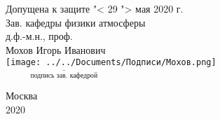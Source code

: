 \begin{titlepage}
\vspace{2em}

\noindent Допущена к защите "< 29 "> мая 2020 г. \\
Зав. кафедры физики атмосферы \\ 
д.ф.-м.н., проф. \\
Мохов Игорь Иванович \\
\hspace*{1.4cm}\vspace*{-0.8cm}\texttt{[image: ../../Documents/Подписи/Мохов.png]} \\
$\underset{\text{подпись зав. кафедрой}}{\underline{\hspace{5cm}}}$

\vfill\begin{center}
    Москва \\
    2020
\end{center}

\end{titlepage}